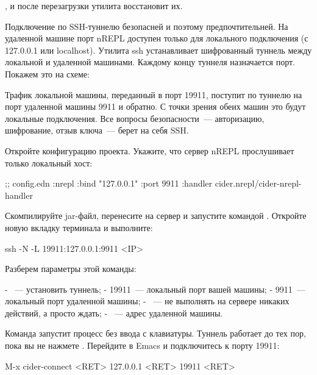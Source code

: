 , и после перезагрузки утилита восстановит их.

Подключение по SSH-туннелю безопасней и поэтому предпочтительней. На удаленной машине порт nREPL доступен только для локального подключения (с 127.0.0.1 или localhost). Утилита ssh устанавливает шифрованный туннель между локальной и удаленной машинами. Каждому концу туннеля назначается порт. Покажем это на схеме:

\begin{figure}[H]
  \centering
  
  \label{fig:chart-repl-02}
\end{figure}

Трафик локальной машины, переданный в порт 19911, поступит по туннелю на порт удаленной машины 9911 и обратно. С точки зрения обеих машин это будут локальные подключения. Все вопросы безопасности~--- авторизацию, шифрование, отзыв ключа~--- берет на себя SSH.

Откройте конфигурацию проекта. Укажите, что сервер nREPL прослушивает только локальный хост:

\begin{english}
  \begin{clojure}
;; config.edn
{:nrepl {:bind "127.0.0.1"
         :port 9911
         :handler cider.nrepl/cider-nrepl-handler}}
  \end{clojure}
\end{english}

Скомпилируйте jar-файл, перенесите на сервер и запустите командой . Откройте новую вкладку терминала и выполните:

\begin{english}
  \begin{bash}
ssh -N -L 19911:127.0.0.1:9911 <IP>
  \end{bash}
\end{english}

Разберем параметры этой команды:

- ~--- установить туннель;
- 19911~--- локальный порт вашей машины;
- 9911~--- локальный порт удаленной машины;
- ~--- не выполнять на сервере никаких действий, а просто ждать;
- ~--- адрес удаленной машины.

Команда запустит процесс  без ввода с клавиатуры. Туннель работает до тех пор, пока вы не нажмете . Перейдите в Emacs и подключитесь к порту 19911:

\begin{english}
  \begin{clojure}
M-x cider-connect <RET> 127.0.0.1 <RET> 19911 <RET>
  \end{clojure}
\end{english}


